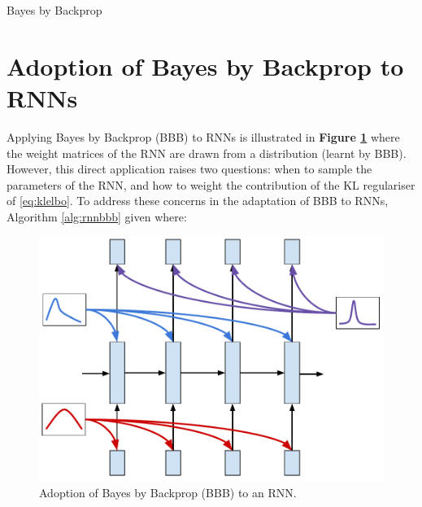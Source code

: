 \begin{algorithm}[ht]
	\caption{Bayes by Backprop}
	\label{alg:bbb}
	\begin{algorithmic}
	\end{algorithmic}
\end{algorithm}

\section{Adoption of Bayes by Backprop to RNNs}
\label{sec:tbbbtt}

Applying Bayes by Backprop (BBB) to RNNs is illustrated in \textbf{Figure \ref{fig:lstmbbb}} where the weight matrices of the RNN are drawn from a distribution (learnt by BBB).
However, this direct application raises two questions: when to sample the parameters of the RNN, and how to weight the contribution of the KL regulariser of \eqref{eq:klelbo}.
To address these concerns in the adaptation of BBB to RNNs, Algorithm \ref{alg:rnnbbb} given where:

\begin{figure}
	\centering
	\includegraphics[width=\linewidth]{figs/LSTMBBB}
	\caption{Adoption of Bayes by Backprop (BBB) to an RNN.}
	\label{fig:lstmbbb}
\end{figure}

